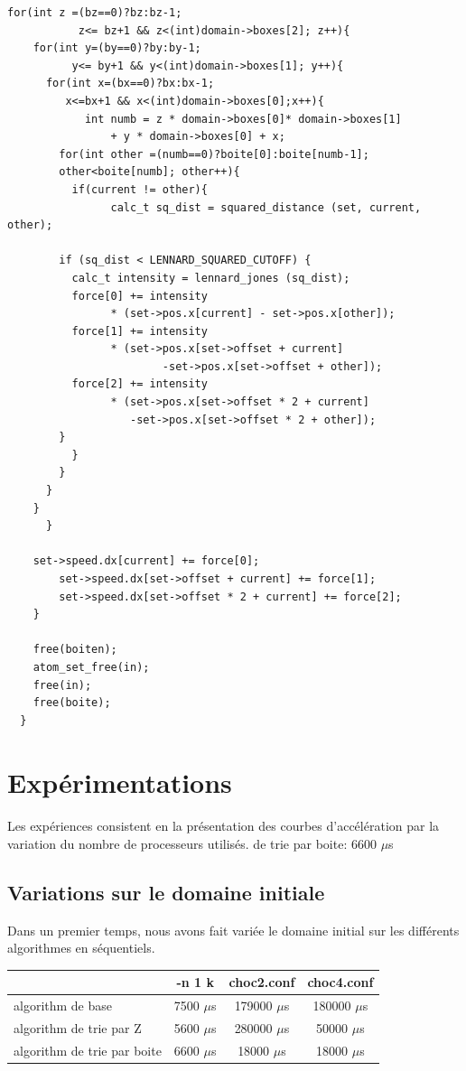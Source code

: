 \documentclass[a4paper,11pt]{report}
\begin{document}
\begin{lstlisting}[style=CStyle]
      for(int z =(bz==0)?bz:bz-1; 
		   z<= bz+1 && z<(int)domain->boxes[2]; z++){
	for(int y=(by==0)?by:by-1; 
		  y<= by+1 && y<(int)domain->boxes[1]; y++){
	  for(int x=(bx==0)?bx:bx-1;
		 x<=bx+1 && x<(int)domain->boxes[0];x++){
            int numb = z * domain->boxes[0]* domain->boxes[1] 
				+ y * domain->boxes[0] + x;
	    for(int other =(numb==0)?boite[0]:boite[numb-1]; 
		other<boite[numb]; other++){
	      if(current != other){
                calc_t sq_dist = squared_distance (set, current, other);

		if (sq_dist < LENNARD_SQUARED_CUTOFF) {
		  calc_t intensity = lennard_jones (sq_dist);
		  force[0] += intensity 
				* (set->pos.x[current] - set->pos.x[other]);
		  force[1] += intensity 
				* (set->pos.x[set->offset + current] 
			            -set->pos.x[set->offset + other]);
		  force[2] += intensity 
				* (set->pos.x[set->offset * 2 + current] 
				   -set->pos.x[set->offset * 2 + other]);
		}
	      }
	    }
	  }
	}
      } 
	
	set->speed.dx[current] += force[0];
        set->speed.dx[set->offset + current] += force[1];
        set->speed.dx[set->offset * 2 + current] += force[2];
    }
    
    free(boiten);
    atom_set_free(in);
    free(in);
    free(boite);
  }

\end{lstlisting}

\section{Expérimentations}
\paragraph{}
Les expériences consistent en la présentation des courbes d'accélération par la variation du nombre de processeurs utilisés.  de trie par boite:  6600  $\mu$s

\subsection{Variations sur le domaine initiale}
Dans un premier temps, nous avons fait variée le domaine initial sur les différents algorithmes en séquentiels.
\begin{center}
\begin{tabular}{ |l | c | c | c | }
\hline
 & -n 1 k & choc2.conf & choc4.conf \\
\hline
algorithm de base & 7500  $\mu$s& 179000  $\mu$s& 180000  $\mu$s\\
algorithm de trie par Z & 5600  $\mu$s& 280000  $\mu$s& 50000  $\mu$s\\
algorithm de trie par boite & 6600  $\mu$s& 18000  $\mu$s& 18000  $\mu$s\\
\hline

\end{tabular}
\end{center}
\end{document}
